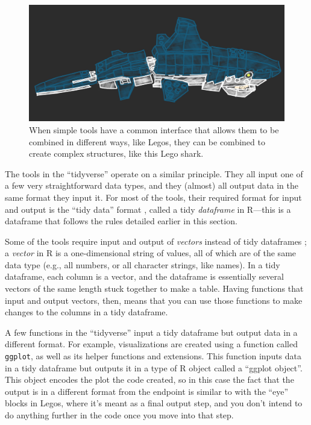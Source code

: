 \documentclass[]{tufte-book}
\begin{document}
\begin{figure}
\includegraphics[width=\textwidth]{figures/legoshark} \caption[When simple tools have a common interface that allows them to be combined in different ways, like Legos, they can be combined to create complex structures, like this Lego shark]{When simple tools have a common interface that allows them to be combined in different ways, like Legos, they can be combined to create complex structures, like this Lego shark.}\label{fig:legoshark}
\end{figure}

The tools in the ``tidyverse'' operate on a similar principle. They all input one
of a few very straightforward data types, and they (almost) all output data in
the same format they input it. For most of the tools, their required format for
input and output is the ``tidy data'' format \citep{wickham2014tidy}, called a tidy
\emph{dataframe} in R---this is a dataframe that follows the rules detailed earlier
in this section.

Some of the tools require input and output of \emph{vectors} instead of tidy
dataframes \citep{wickham2014tidy}; a \emph{vector} in R is a one-dimensional string of values,
all of which are of the same data type (e.g., all numbers, or all character
strings, like names). In a tidy dataframe, each column is a vector, and the
dataframe is essentially several vectors of the same length stuck together to
make a table. Having functions that input and output vectors, then, means that
you can use those functions to make changes to the columns in a tidy dataframe.

A few functions in the ``tidyverse'' input a tidy dataframe but output data in a
different format. For example, visualizations are created using a function
called \texttt{ggplot}, as well as its helper functions and extensions. This function
inputs data in a tidy dataframe but outputs it in a type of R object called a
``ggplot object''. This object encodes the plot the code created, so in this case
the fact that the output is in a different format from the endpoint is similar
to with the ``eye'' blocks in Legos, where it's meant as a final output step, and
you don't intend to do anything further in the code once you move into that
step.
\end{document}
